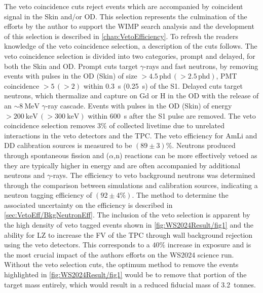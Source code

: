 The veto coincidence cuts reject events which are accompanied by coincident signal in the Skin and/or OD. This selection represents the culmination of the efforts by the author to support the WIMP search analysis and the development of this selection is described in \autoref{chap:VetoEfficiency}. To refresh the readers knowledge of the veto coincidence selection, a description of the cuts follows. 
The veto coincidence selection is divided into two categories, prompt and delayed, for both the Skin and OD. Prompt cuts target $\gamma$-rays and fast neutrons, by removing events with pulses in the OD (Skin) of size $>4.5\,\text{phd}\,(>2.5\,\text{phd})$, PMT coincidence $>5\,(>2)$ within 0.3~\textmu s (0.25~\textmu s) of the S1. Delayed cuts target neutrons, which thermalize and capture on Gd or H in the OD with the release of an $\sim8~\text{MeV}$ $\gamma$-ray cascade. Events with pulses in the OD (Skin) of energy $>200~\text{keV}\,(>300~\text{keV})$ within 600~\textmu s after the S1 pulse are removed. The veto coincidence selection removes $3\%$ of collected livetime due to unrelated interactions in the veto detectors and the TPC. The veto efficiency for AmLi and DD calibration sources is measured to be $(89\pm3)\%$. Neutrons produced through spontaneous fission and ($\alpha$,n) reactions can be more effectively vetoed as they are typically higher in energy and are often accompanied by additional neutrons and $\gamma$-rays. The efficiency to veto background neutrons was determined through the comparison between simulations and calibration sources, indicating a neutron tagging efficiency of  $(92\pm4\%)$. The method to determine the associated uncertainty on the efficiency is described in \autoref{sec:VetoEff/BkgNeutronEff}.
The inclusion of the veto selection is apparent by the high density of veto tagged events shown in \autoref{fig:WS2024Result/fig1} and the ability for LZ to increase the FV of the TPC through wall background rejection using the veto detectors. This corresponds to a $40\%$ increase in exposure and is the most crucial impact of the authors efforts on the WS2024 science run. Without the veto selection cuts, the optimum method to remove the events highlighted in \autoref{fig:WS2024Result/fig1} would be to remove that portion of the target mass entirely, which would result in a reduced fiducial mass of 3.2~tonnes.

